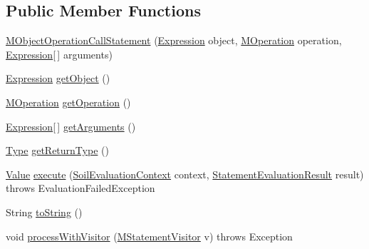\subsection*{Public Member Functions}
\begin{DoxyCompactItemize}
\item 
\hyperlink{classorg_1_1tzi_1_1use_1_1uml_1_1sys_1_1soil_1_1_m_object_operation_call_statement_a1b438d1ab104f34b5f0b0e9b487b8eba}{M\-Object\-Operation\-Call\-Statement} (\hyperlink{classorg_1_1tzi_1_1use_1_1uml_1_1ocl_1_1expr_1_1_expression}{Expression} object, \hyperlink{classorg_1_1tzi_1_1use_1_1uml_1_1mm_1_1_m_operation}{M\-Operation} operation, \hyperlink{classorg_1_1tzi_1_1use_1_1uml_1_1ocl_1_1expr_1_1_expression}{Expression}\mbox{[}$\,$\mbox{]} arguments)
\item 
\hyperlink{classorg_1_1tzi_1_1use_1_1uml_1_1ocl_1_1expr_1_1_expression}{Expression} \hyperlink{classorg_1_1tzi_1_1use_1_1uml_1_1sys_1_1soil_1_1_m_object_operation_call_statement_a74f33fde419f85e07b3f3b663f2b88f8}{get\-Object} ()
\item 
\hyperlink{classorg_1_1tzi_1_1use_1_1uml_1_1mm_1_1_m_operation}{M\-Operation} \hyperlink{classorg_1_1tzi_1_1use_1_1uml_1_1sys_1_1soil_1_1_m_object_operation_call_statement_af162f9e5629482cfb49cf0647ded5f67}{get\-Operation} ()
\item 
\hyperlink{classorg_1_1tzi_1_1use_1_1uml_1_1ocl_1_1expr_1_1_expression}{Expression}\mbox{[}$\,$\mbox{]} \hyperlink{classorg_1_1tzi_1_1use_1_1uml_1_1sys_1_1soil_1_1_m_object_operation_call_statement_af34d4329ce1d4f040134411b0d353bc5}{get\-Arguments} ()
\item 
\hyperlink{interfaceorg_1_1tzi_1_1use_1_1uml_1_1ocl_1_1type_1_1_type}{Type} \hyperlink{classorg_1_1tzi_1_1use_1_1uml_1_1sys_1_1soil_1_1_m_object_operation_call_statement_a006e51b6076aad1f14525bf444ac0097}{get\-Return\-Type} ()
\item 
\hyperlink{classorg_1_1tzi_1_1use_1_1uml_1_1ocl_1_1value_1_1_value}{Value} \hyperlink{classorg_1_1tzi_1_1use_1_1uml_1_1sys_1_1soil_1_1_m_object_operation_call_statement_a701f6c98bff7e1bd4a27276906bf7913}{execute} (\hyperlink{classorg_1_1tzi_1_1use_1_1uml_1_1sys_1_1soil_1_1_soil_evaluation_context}{Soil\-Evaluation\-Context} context, \hyperlink{classorg_1_1tzi_1_1use_1_1uml_1_1sys_1_1_statement_evaluation_result}{Statement\-Evaluation\-Result} result)  throws Evaluation\-Failed\-Exception 
\item 
String \hyperlink{classorg_1_1tzi_1_1use_1_1uml_1_1sys_1_1soil_1_1_m_object_operation_call_statement_a4730674b8f683c9f0bee7f8662d9b926}{to\-String} ()
\item 
void \hyperlink{classorg_1_1tzi_1_1use_1_1uml_1_1sys_1_1soil_1_1_m_object_operation_call_statement_a195f6a8d4fcf3d12997a6c99480b12aa}{process\-With\-Visitor} (\hyperlink{interfaceorg_1_1tzi_1_1use_1_1uml_1_1sys_1_1soil_1_1_m_statement_visitor}{M\-Statement\-Visitor} v)  throws Exception 
\end{DoxyCompactItemize}
